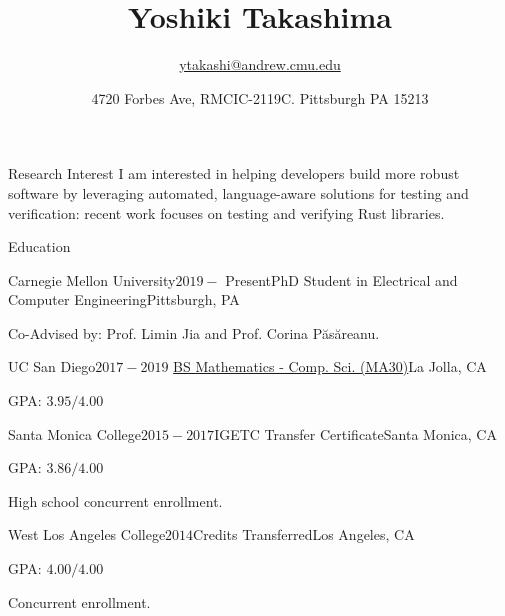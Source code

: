 \documentclass{resume} %
\title{\bf Yoshiki Takashima}
\author{\href{ytakashi@andrew.cmu.edu}{ytakashi@andrew.cmu.edu}}
\date{4720 Forbes Ave, RMCIC-2119C. Pittsburgh PA 15213}
\begin{document}
\maketitle

\begin{rSection}{Research Interest}
  I am interested in helping developers build more robust software by
  leveraging automated, language-aware solutions for testing and
  verification: recent work focuses on testing and verifying Rust
  libraries.
\end{rSection}

\begin{rSection}{Education}
  \begin{rSubsection}{Carnegie Mellon University}{$2019 -$
      Present}{PhD Student in Electrical and Computer
      Engineering}{Pittsburgh, PA}
  \item Co-Advised by: Prof. Limin Jia and Prof. Corina P\u{a}s\u{a}reanu.
  \end{rSubsection}

  \begin{rSubsection}{UC San Diego}{$2017 -
      2019$}{
      \href{https://catalog.ucsd.edu/curric/MATH-ug.html}
      {BS Mathematics - Comp. Sci. (MA30)}}{La Jolla, CA}
  \item GPA: $3.95/4.00$
  \end{rSubsection}

  \begin{rSubsection}{Santa Monica College}{$2015 -
      2017$}{IGETC Transfer Certificate}{Santa Monica, CA}
  \item GPA: $3.86/4.00$
  \item High school concurrent enrollment.
  \end{rSubsection}

  \begin{rSubsection}{West Los Angeles College}{$2014$}{Credits
      Transferred}{Los Angeles, CA}
  \item GPA: $4.00/4.00$
  \item Concurrent enrollment.
  \end{rSubsection}
\end{rSection}
\end{document}

